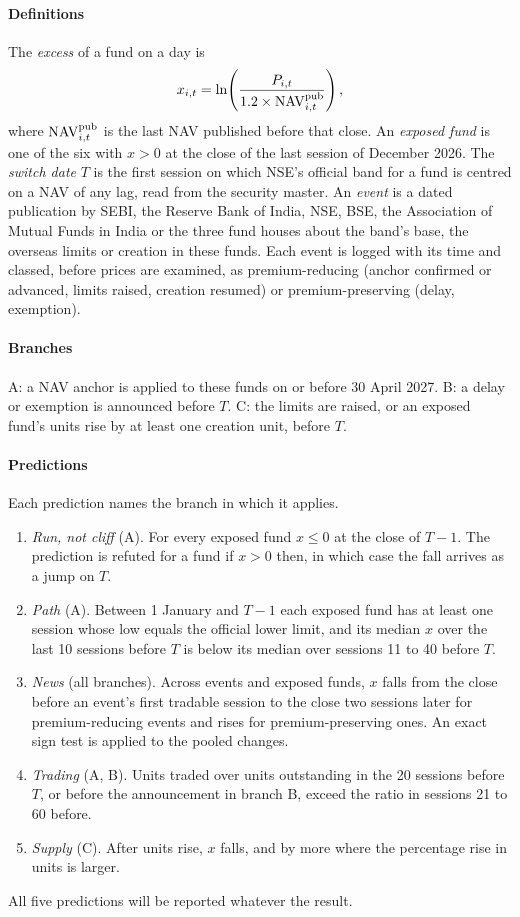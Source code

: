 \paragraph{Definitions} The \emph{excess} of a fund on a day is
\begin{equation}\label{eq:xapril}
x_{i,t}=\ln\!\left(\frac{P_{i,t}}{1.2\times\mathrm{NAV}^{\mathrm{pub}}_{i,t}}\right),
\end{equation}
where $\mathrm{NAV}^{\mathrm{pub}}_{i,t}$ is the last NAV published before that close. An \emph{exposed fund} is one of the six with $x>0$ at the close of the last session of December 2026. The \emph{switch date} $T$ is the first session on which NSE's official band for a fund is centred on a NAV of any lag, read from the security master. An \emph{event} is a dated publication by SEBI, the Reserve Bank of India, NSE, BSE, the Association of Mutual Funds in India or the three fund houses about the band's base, the overseas limits or creation in these funds. Each event is logged with its time and classed, before prices are examined, as premium-reducing (anchor confirmed or advanced, limits raised, creation resumed) or premium-preserving (delay, exemption).

\paragraph{Branches} A: a NAV anchor is applied to these funds on or before 30 April 2027. B: a delay or exemption is announced before $T$. C: the limits are raised, or an exposed fund's units rise by at least one creation unit, before $T$.

\paragraph{Predictions} Each prediction names the branch in which it applies.\nopagebreak
\begin{enumerate}
\item \emph{Run, not cliff} (A). For every exposed fund $x\le 0$ at the close of $T-1$. The prediction is refuted for a fund if $x>0$ then, in which case the fall arrives as a jump on $T$.
\item \emph{Path} (A). Between 1 January and $T-1$ each exposed fund has at least one session whose low equals the official lower limit, and its median $x$ over the last 10 sessions before $T$ is below its median over sessions 11 to 40 before $T$.
\item \emph{News} (all branches). Across events and exposed funds, $x$ falls from the close before an event's first tradable session to the close two sessions later for premium-reducing events and rises for premium-preserving ones. An exact sign test is applied to the pooled changes.
\item \emph{Trading} (A, B). Units traded over units outstanding in the 20 sessions before $T$, or before the announcement in branch B, exceed the ratio in sessions 21 to 60 before.
\item \emph{Supply} (C). After units rise, $x$ falls, and by more where the percentage rise in units is larger.
\end{enumerate}
All five predictions will be reported whatever the result.

